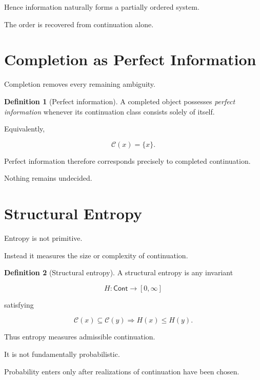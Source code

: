 \documentclass[13pt,openany]{book}
\theoremstyle{plain}
\theoremstyle{definition}
\newtheorem{definition}{Definition}[chapter]
\begin{document}
Hence information naturally forms a partially ordered system.

The order is recovered from continuation alone.

\section{Completion as Perfect Information}

Completion removes every remaining ambiguity.

\begin{definition}[Perfect information]
A completed object possesses
\emph{perfect information}
whenever its continuation class consists solely of itself.

Equivalently,

\[
\mathcal C(x)=\{x\}.
\]
\end{definition}

Perfect information therefore corresponds precisely to completed continuation.

Nothing remains undecided.

\section{Structural Entropy}

Entropy is not primitive.

Instead it measures the size or complexity of continuation.

\begin{definition}[Structural entropy]
A structural entropy is any invariant

\[
H:
\mathsf{Cont}
\rightarrow
[0,\infty]
\]

satisfying

\[
\mathcal C(x)\subseteq\mathcal C(y)
\Longrightarrow
H(x)\le H(y).
\]
\end{definition}

Thus entropy measures admissible continuation.

It is not fundamentally probabilistic.

Probability enters only after realizations of continuation have been chosen.

\end{document}
